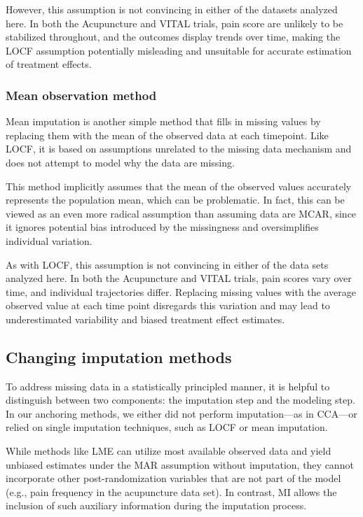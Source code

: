 \documentclass{article}
\begin{document}
However, this assumption is not convincing in either of the datasets
analyzed here. In both the Acupuncture and VITAL trials, pain score are
unlikely to be stabilized throughout, and the outcomes display trends
over time, making the LOCF assumption potentially misleading and
unsuitable for accurate estimation of treatment effects.

\subsubsection{Mean observation method}\label{mean-observation-method}

Mean imputation is another simple method that fills in missing values by
replacing them with the mean of the observed data at each timepoint.
Like LOCF, it is based on assumptions unrelated to the missing data
mechanism and does not attempt to model why the data are missing.

This method implicitly assumes that the mean of the observed values
accurately represents the population mean, which can be problematic. In
fact, this can be viewed as an even more radical assumption than
assuming data are MCAR, since it ignores potential bias introduced by
the missingness and oversimplifies individual variation.

As with LOCF, this assumption is not convincing in either of the data
sets analyzed here. In both the Acupuncture and VITAL trials, pain
scores vary over time, and individual trajectories differ. Replacing
missing values with the average observed value at each time point
disregards this variation and may lead to underestimated variability and
biased treatment effect estimates.

\subsection{Changing imputation
methods}\label{changing-imputation-methods}

To address missing data in a statistically principled manner, it is
helpful to distinguish between two components: the imputation step and
the modeling step. In our anchoring methods, we either did not perform
imputation---as in CCA---or relied on single imputation techniques, such
as LOCF or mean imputation.

While methods like LME can utilize most available observed data and
yield unbiased estimates under the MAR assumption without imputation,
they cannot incorporate other post-randomization variables that are not
part of the model (e.g., pain frequency in the acupuncture data set). In
contrast, MI allows the inclusion of such auxiliary information during
the imputation process.
\end{document}
